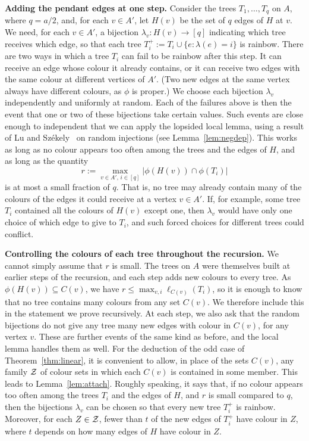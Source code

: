 \smallskip

\noindent\textbf{Adding the pendant edges at one step.}
Consider the trees $T_1,\ldots,T_q$ on $A$, where $q=a/2$, and, for each $v\in A'$, let $H(v)$ be the set of $q$ edges of $H$ at $v$.
We need, for each $v\in A'$, a bijection $\lambda_v:H(v)\to[q]$ indicating which tree receives which edge, so that each tree $T_i^+:=T_i\cup\{e:\lambda(e)=i\}$ is rainbow.
There are two ways in which a tree $T_i$ can fail to be rainbow after this step.
It can receive an edge whose colour it already contains, or it can receive two edges with the same colour at different vertices of $A'$.
(Two new edges at the same vertex always have different colours, as $\phi$ is proper.)
We choose each bijection $\lambda_v$ independently and uniformly at random.
Each of the failures above is then the event that one or two of these bijections take certain values.
Such events are close enough to independent that we can apply the lopsided local lemma, using a result of Lu and Sz\'ekely~\cite{LS} on random injections (see Lemma~\ref{lem:negdep}).
This works as long as no colour appears too often among the trees and the edges of $H$, and as long as the quantity
\begin{equation}\label{eq:sketch-r}
r:=\max_{v\in A',\,i\in[q]}\bigl|\phi(H(v))\cap \phi(T_i)\bigr|
\end{equation}
is at most a small fraction of $q$.
That is, no tree may already contain many of the colours of the edges it could receive at a vertex $v\in A'$.
If, for example, some tree $T_i$ contained all the colours of $H(v)$ except one, then $\lambda_v$ would have only one choice of which edge to give to $T_i$, and such forced choices for different trees could conflict.

\smallskip

\noindent\textbf{Controlling the colours of each tree throughout the recursion.}
We cannot simply assume that $r$ is small.
The trees on $A$ were themselves built at earlier steps of the recursion, and each step adds new colours to every tree.
As $\phi(H(v))\subseteq C(v)$, we have $r\leq \max_{v,i}\ell_{C(v)}(T_i)$, so it is enough to know that no tree contains many colours from any set $C(v)$.
We therefore include this in the statement we prove recursively.
At each step, we also ask that the random bijections do not give any tree many new edges with colour in $C(v)$, for any vertex $v$.
These are further events of the same kind as before, and the local lemma handles them as well.
For the deduction of the odd case of Theorem~\ref{thm:linear}, it is convenient to allow, in place of the sets $C(v)$, any family $\mathcal{Z}$ of colour sets in which each $C(v)$ is contained in some member.
This leads to Lemma~\ref{lem:attach}. Roughly speaking, it says that, if no colour appears too often among the trees $T_i$ and the edges of $H$, and $r$ is small compared to $q$, then the bijections $\lambda_v$ can be chosen so that every new tree $T_i^+$ is rainbow.
Moreover, for each $Z\in \mathcal{Z}$, fewer than $t$ of the new edges of $T_i^+$ have colour in $Z$, where $t$ depends on how many edges of $H$ have colour in $Z$.

